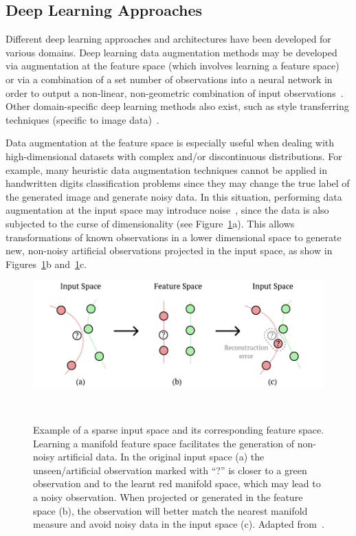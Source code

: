 \documentclass[parskip=full]{scrartcl}
\begin{document}
\subsection{Deep Learning Approaches}

Different deep learning approaches and architectures have been developed for
various domains. Deep learning data augmentation methods may be developed via
augmentation at the feature space (which involves learning a feature
space)~\cite{DeVries2017} or via a combination of a set number of observations
into a neural network in order to output a non-linear, non-geometric
combination of input observations~\cite{Wang2017}. Other domain-specific deep
learning methods also exist, such as style transferring techniques (specific
to image data)~\cite{Wang2017, Zhu2017}.

Data augmentation at the feature space is especially useful when dealing with
high-dimensional datasets with complex and/or discontinuous distributions.
For example, many heuristic data augmentation techniques cannot be applied in
handwritten digits classification problems since they may change the true
label of the generated image and generate noisy data. In this situation,
performing data augmentation at the input space may introduce
noise~\cite{Chu2020}, since the data is also subjected to the curse of
dimensionality (see Figure~\ref{fig:input_vs_feature_space}a). This allows
transformations of known observations in a lower dimensional space to generate
new, non-noisy artificial observations projected in the input space, as show
in Figures~\ref{fig:input_vs_feature_space}b
and~\ref{fig:input_vs_feature_space}c. 

\begin{figure}[htb]
	\centering
	\includegraphics[width=.75\linewidth]{../analysis/input_vs_feature_space}
    \caption{%
        Example of a sparse input space and its corresponding feature space.
        Learning a manifold feature space facilitates the generation of
        non-noisy artificial data. In the original input space (a) the
        unseen/artificial observation marked with ``?'' is closer to a green
        observation and to the learnt red manifold space, which may lead to a
        noisy observation. When projected or generated in the feature space
        (b), the observation will better match the nearest manifold measure
        and avoid noisy data in the input space (c). Adapted
        from~\cite{Antoniou2017}.
    }~\label{fig:input_vs_feature_space}
\end{figure}
\end{document}
